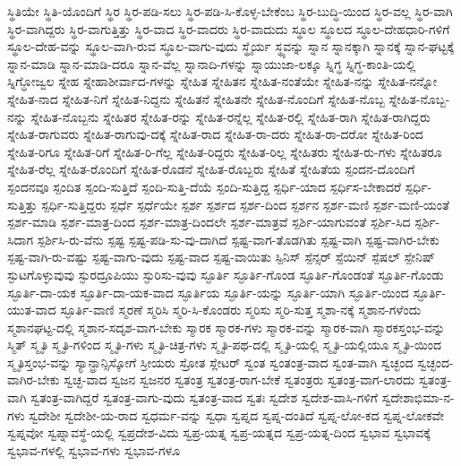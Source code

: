 {ಸ್ಥಿತಿಯೇ
ಸ್ಥಿತಿ-ಯೊಂದಿಗೆ
ಸ್ಥಿರ
ಸ್ಥಿರ-ಪಡಿ-ಸಲು
ಸ್ಥಿರ-ಪಡಿ-ಸಿ-ಕೊಳ್ಳ-ಬೇಕೆಂಬ
ಸ್ಥಿರ-ಬುದ್ಧಿ-ಯಿಂದ
ಸ್ಥಿರ-ವಲ್ಲ
ಸ್ಥಿರ-ವಾಗಿ
ಸ್ಥಿರ-ವಾಗಿದ್ದರು
ಸ್ಥಿರ-ವಾಗುತ್ತಿತ್ತು
ಸ್ಥಿರ-ವಾದ
ಸ್ಥಿರ-ವಾದರು
ಸ್ಥಿರ-ವಾದುದು
ಸ್ಥೂಲ
ಸ್ಥೂಲದ
ಸ್ಥೂಲ-ದೇಹಧಾರಿ-ಗಳಿಗೆ
ಸ್ಥೂಲ-ದೇಹ-ವನ್ನು
ಸ್ಥೂಲ-ವಾಗಿ-ರುವ
ಸ್ಥೂಲ-ವಾಗು-ವುದು
ಸ್ಥೈರ್ಯ
ಸ್ಥ್ಯವನ್ನು
ಸ್ನಾನ
ಸ್ನಾನಕ್ಕಾಗಿ
ಸ್ನಾನಕ್ಕೆ
ಸ್ನಾನ-ಘಟ್ಟಕ್ಕೆ
ಸ್ನಾನ-ಮಾಡಿ
ಸ್ನಾನ-ಮಾಡಿ-ದರೂ
ಸ್ನಾನ-ವೆಲ್ಲ
ಸ್ನಾನಾದಿ-ಗಳನ್ನು
ಸ್ನಾಯುಜಾ-ಲಕ್ಕೂ
ಸ್ನಿಗ್ಧ
ಸ್ನಿಗ್ಧ-ಕಾಂತಿ-ಯಲ್ಲಿ
ಸ್ನಿಗ್ಧೋಜ್ವಲ
ಸ್ನೇಹ
ಸ್ನೇಹಾಶೀರ್ವಾದ-ಗಳನ್ನು
ಸ್ನೇಹಿತ
ಸ್ನೇಹಿತನ
ಸ್ನೇಹಿತ-ನಂತೆಯೇ
ಸ್ನೇಹಿತ-ನನ್ನು
ಸ್ನೇಹಿತ-ನನ್ನೋ
ಸ್ನೇಹಿತ-ನಾದ
ಸ್ನೇಹಿತ-ನಿಗೆ
ಸ್ನೇಹಿತ-ನಿದ್ದನು
ಸ್ನೇಹಿತನೆ
ಸ್ನೇಹಿತನೇ
ಸ್ನೇಹಿತ-ನೊಂದಿಗೆ
ಸ್ನೇಹಿತ-ನೊಬ್ಬ
ಸ್ನೇಹಿತ-ನೊಬ್ಬ-ನನ್ನು
ಸ್ನೇಹಿತ-ನೊಬ್ಬನು
ಸ್ನೇಹಿತರ
ಸ್ನೇಹಿತ-ರನ್ನು
ಸ್ನೇಹಿತ-ರನ್ನೆಲ್ಲ
ಸ್ನೇಹಿತ-ರಲ್ಲಿ
ಸ್ನೇಹಿತ-ರಾಗಿ
ಸ್ನೇಹಿತ-ರಾಗಿದ್ದರು
ಸ್ನೇಹಿತ-ರಾಗುವರು
ಸ್ನೇಹಿತ-ರಾಗುವು-ದಕ್ಕೆ
ಸ್ನೇಹಿತ-ರಾದ
ಸ್ನೇಹಿತ-ರಾ-ದರು
ಸ್ನೇಹಿತ-ರಾ-ದರೋ
ಸ್ನೇಹಿತ-ರಿಂದ
ಸ್ನೇಹಿತ-ರಿಗೂ
ಸ್ನೇಹಿತ-ರಿಗೆ
ಸ್ನೇಹಿತ-ರಿ-ಗೆಲ್ಲ
ಸ್ನೇಹಿತ-ರಿದ್ದರು
ಸ್ನೇಹಿತ-ರಿಲ್ಲ
ಸ್ನೇಹಿತರು
ಸ್ನೇಹಿತ-ರು-ಗಳು
ಸ್ನೇಹಿತರೂ
ಸ್ನೇಹಿತ-ರೆಲ್ಲ
ಸ್ನೇಹಿತ-ರೊಂದಿಗೆ
ಸ್ನೇಹಿತ-ರೊಡನೆ
ಸ್ನೇಹಿತ-ರೊಬ್ಬರು
ಸ್ನೇಹಿತೆ
ಸ್ನೇಹಿತೆಯ
ಸ್ಪಂದನ-ದೊಂದಿಗೆ
ಸ್ಪಂದನವೂ
ಸ್ಪಂದಿತ
ಸ್ಪಂದಿ-ಸುತ್ತಿದೆ
ಸ್ಪಂದಿ-ಸುತ್ತಿ-ದೆಯೆ
ಸ್ಪಂದಿ-ಸುತ್ತಿದ್ದ
ಸ್ಪರ್ಧಿ-ಯಾದ
ಸ್ಪರ್ಧಿಸ-ಬೇಕಾದರೆ
ಸ್ಪರ್ಧಿ-ಸುತ್ತಿತ್ತು
ಸ್ಪರ್ಧಿ-ಸುತ್ತಿದ್ದರು
ಸ್ಪರ್ಧೆ
ಸ್ಪರ್ಧೆಯೇ
ಸ್ಪರ್ಶ
ಸ್ಪರ್ಶದ
ಸ್ಪರ್ಶ-ದಿಂದ
ಸ್ಪರ್ಶನ
ಸ್ಪರ್ಶ-ಮಣಿ
ಸ್ಪರ್ಶ-ಮಣಿ-ಯಂತೆ
ಸ್ಪರ್ಶ-ಮಾಡಿ
ಸ್ಪರ್ಶ-ಮಾತ್ರ-ದಿಂದ
ಸ್ಪರ್ಶ-ಮಾತ್ರ-ದಿಂದಲೇ
ಸ್ಪರ್ಶ-ಮಾತ್ರವೆ
ಸ್ಪರ್ಶಿ-ಯಾಗುವಂತೆ
ಸ್ಪರ್ಶಿ-ಸಿದ
ಸ್ಪರ್ಶಿ-ಸಿದಾಗ
ಸ್ಪರ್ಶಿಸಿ-ರು-ವೆನು
ಸ್ಪಷ್ಟ
ಸ್ಪಷ್ಟ-ಪಡಿ-ಸು-ವು-ದಾಗಿದೆ
ಸ್ಪಷ್ಟ-ವಾಗ-ತೊಡಗಿತು
ಸ್ಪಷ್ಟ-ವಾಗಿ
ಸ್ಪಷ್ಟ-ವಾಗಿರ-ಬೇಕು
ಸ್ಪಷ್ಟ-ವಾಗಿ-ರು-ವಷ್ಟು
ಸ್ಪಷ್ಟ-ವಾಗು-ವುದು
ಸ್ಪಷ್ಟ-ವಾದ
ಸ್ಪಷ್ಟ-ವಾಯಿತು
ಸ್ಪಿನಿಸ್
ಸ್ಪೆನ್ಸರ್
ಸ್ಪೆಯಿನ್
ಸ್ಪೆಷಲ್
ಸ್ಪೇನಿಷ್
ಸ್ಫುಟಗೊಳ್ಳುವುವು
ಸ್ಫುರದ್ರೂಪಿಯು
ಸ್ಫುರಿಸು-ವುವು
ಸ್ಫೂರ್ತಿ
ಸ್ಫೂರ್ತಿ-ಗೊಂಡ
ಸ್ಫೂರ್ತಿ-ಗೊಂಡಂತೆ
ಸ್ಫೂರ್ತಿ-ಗೊಂಡು
ಸ್ಫೂರ್ತಿ-ದಾ-ಯಕ
ಸ್ಫೂರ್ತಿ-ದಾ-ಯಕ-ವಾದ
ಸ್ಫೂರ್ತಿಯ
ಸ್ಫೂರ್ತಿ-ಯನ್ನು
ಸ್ಫೂರ್ತಿ-ಯಾಗಿ
ಸ್ಫೂರ್ತಿ-ಯಿಂದ
ಸ್ಫೂರ್ತಿ-ಯುತ-ವಾದ
ಸ್ಫೂರ್ತಿ-ವಾಣಿ
ಸ್ಮರಣೆ
ಸ್ಮರಿಸಿ
ಸ್ಮರಿ-ಸಿ-ಕೊಂಡರು
ಸ್ಮರಿಸು
ಸ್ಮರಿ-ಸುತ್ತ
ಸ್ಮಶಾ-ನಕ್ಕೆ
ಸ್ಮಶಾನ-ಗಳೆಂದು
ಸ್ಮಶಾನಘಟ್ಟ-ದಲ್ಲಿ
ಸ್ಮಶಾನ-ಸದೃಶ-ವಾಗ-ಬೇಕು
ಸ್ಮಾರಕ
ಸ್ಮಾರಕ-ಗಳು
ಸ್ಮಾರಕ-ವನ್ನು
ಸ್ಮಾರಕ-ವಾಗಿ
ಸ್ಮಾರಕಸ್ತಂಭ-ವನ್ನು
ಸ್ಮಿತ್
ಸ್ಮೃತಿ
ಸ್ಮೃತಿ-ಗಳಿಂದ
ಸ್ಮೃತಿ-ಗಳು
ಸ್ಮೃತಿ-ಚಿತ್ರ-ಗಳು
ಸ್ಮೃತಿ-ಪಥ-ದಲ್ಲಿ
ಸ್ಮೃತಿ-ಯಲ್ಲಿ
ಸ್ಮೃತಿ-ಯಲ್ಲಿಯೂ
ಸ್ಮೃತಿ-ಯಿಂದ
ಸ್ಮೃತಿಸ್ತಂಭ-ವನ್ನು
ಸ್ಯಾನ್ಫ್ರಾನ್ಸಿಸ್ಕೋಗೆ
ಸ್ರೀಯರು
ಸ್ರೋತ
ಸ್ಲೇಟರ್
ಸ್ವಂತ
ಸ್ವಂತಂತ್ರ-ವಾದ
ಸ್ವಂತ-ವಾಗಿ
ಸ್ವಚ್ಛಂದ
ಸ್ವಚ್ಛಂದ-ವಾಗಿರ-ಬೇಕು
ಸ್ವಚ್ಛ-ವಾದ
ಸ್ವಜನ
ಸ್ವಜನರ
ಸ್ವತಂತ್ರ
ಸ್ವತಂತ್ರ-ರಾಗ-ಬೇಕೆ
ಸ್ವತಂತ್ರರು
ಸ್ವತಂತ್ರ-ವಾಗ-ಲಾರದು
ಸ್ವತಂತ್ರ-ವಾಗಿ
ಸ್ವತಂತ್ರ-ವಾಗಿದ್ದರೆ
ಸ್ವತಂತ್ರ-ವಾಗು-ವುದು
ಸ್ವತಂತ್ರ-ವಾದ
ಸ್ವತಃ
ಸ್ವದೇಶ
ಸ್ವದೇಶ-ವಾಸಿ-ಗಳಿಗೆ
ಸ್ವದೇಶಾಭಿಮಾ-ನ-ಗಳು
ಸ್ವದೇಶೀ
ಸ್ವದೇಶೀ-ಯ-ರಾದ
ಸ್ವಧರ್ಮ-ವನ್ನು
ಸ್ವಧಾ
ಸ್ವಪ್ನದ
ಸ್ವಪ್ನ-ದಂತಿದೆ
ಸ್ವಪ್ನ-ಲೋ-ಕದ
ಸ್ವಪ್ನ-ಲೋಕವೇ
ಸ್ವಪ್ನವೋ
ಸ್ವಪ್ನಾವಸ್ಥೆ-ಯಲ್ಲಿ
ಸ್ವಪ್ರದೇಶ-ವಿದು
ಸ್ವಪ್ರ-ಯತ್ನ
ಸ್ವಪ್ರ-ಯತ್ನದ
ಸ್ವಪ್ರ-ಯತ್ನ-ದಿಂದ
ಸ್ವಭಾವ
ಸ್ವಭಾವಕ್ಕೆ
ಸ್ವಭಾವ-ಗಳಲ್ಲಿ
ಸ್ವಭಾವ-ಗಳು
ಸ್ವಭಾವ-ಗಳೂ
}
